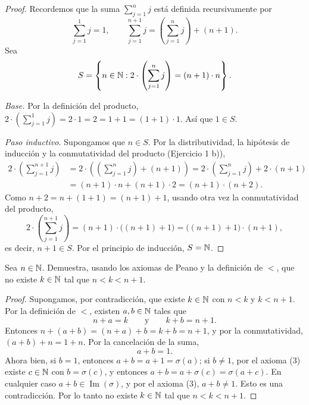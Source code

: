 \documentclass[12pt,a4paper]{article}
\begin{document}
    \begin{proof}
        Recordemos que la suma $\sum_{j=1}^n j$ está definida recursivamente por
        \begin{equation*}
            \sum_{j=1}^{1} j=1, \qquad \sum_{j=1}^{n+1} j=\left(\sum_{j=1}^{n} j\right)+(n+1).
        \end{equation*}
        Sea
        \begin{equation*}
            S=\left\{n\in\mathbb{N} : 2\cdot\left(\sum_{j=1}^{n} j\right)=(n+1)\cdot n\right\}.
        \end{equation*}

        \emph{Base.} Por la definición del producto, $2\cdot\left(\sum_{j=1}^{1} j\right)=2\cdot1=2=1+1=(1+1)\cdot1$.
        Así que $1\in S$.

        \emph{Paso inductivo.} Supongamos que $n\in S$. Por la distributividad, la hipótesis de inducción y la
        conmutatividad del producto (Ejercicio 1 b)),
        \begin{align*}
            2\cdot\left(\sum_{j=1}^{n+1} j\right) &= 2\cdot\left(\left(\sum_{j=1}^{n} j\right)+(n+1)\right)
            = 2\cdot\left(\sum_{j=1}^{n} j\right)+2\cdot(n+1) \\
            &= (n+1)\cdot n+(n+1)\cdot2 = (n+1)\cdot(n+2).
        \end{align*}
        Como $n+2=n+(1+1)=(n+1)+1$, usando otra vez la conmutatividad del producto,
        \begin{equation*}
            2\cdot\left(\sum_{j=1}^{n+1} j\right)=(n+1)\cdot\big((n+1)+1\big)=\big((n+1)+1\big)\cdot(n+1),
        \end{equation*}
        es decir, $n+1\in S$. Por el principio de inducción, $S=\mathbb{N}$.
    \end{proof}

    \begin{problema}
        Sea $n\in\mathbb{N}$. Demuestra, usando los axiomas de Peano y la definición de $<$, que no existe $k\in\mathbb{N}$ tal que
        $n<k<n+1$.
    \end{problema}

    \begin{proof}
        Supongamos, por contradicción, que existe $k\in\mathbb{N}$ con $n<k$ y $k<n+1$. Por la definición de $<$, existen
        $a,b\in\mathbb{N}$ tales que
        \begin{equation*}
            n+a=k \qquad\text{y}\qquad k+b=n+1.
        \end{equation*}
        Entonces $n+(a+b)=(n+a)+b=k+b=n+1$, y por la conmutatividad, $(a+b)+n=1+n$. Por la cancelación de la suma,
        \begin{equation*}
            a+b=1.
        \end{equation*}
        Ahora bien, si $b=1$, entonces $a+b=a+1=\sigma(a)$; si $b\neq1$, por el axioma (3) existe $c\in\mathbb{N}$ con
        $b=\sigma(c)$, y entonces $a+b=a+\sigma(c)=\sigma(a+c)$. En cualquier caso $a+b\in\operatorname{Im}(\sigma)$,
        y por el axioma (3), $a+b\neq1$. Esto es una contradicción. Por lo tanto no existe $k\in\mathbb{N}$ tal que $n<k<n+1$.
    \end{proof}
\end{document}
